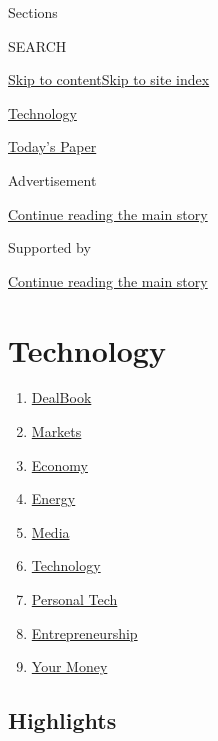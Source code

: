 Sections

SEARCH

\protect\hyperlink{site-content}{Skip to
content}\protect\hyperlink{site-index}{Skip to site index}

\href{https://www.nytimes.com/section/technology}{Technology}

\href{https://myaccount.nytimes.com/auth/login?response_type=cookie\&client_id=vi}{}

\href{https://www.nytimes.com/section/todayspaper}{Today's Paper}

Advertisement

\protect\hyperlink{after-top}{Continue reading the main story}

Supported by

\protect\hyperlink{after-sponsor}{Continue reading the main story}

\hypertarget{technology}{%
\section{Technology}\label{technology}}

\begin{enumerate}
\def\labelenumi{\arabic{enumi}.}
\tightlist
\item
  \href{/pages/business/dealbook/index.html}{DealBook}
\item
  \href{https://markets.on.nytimes.com}{Markets}
\item
  \href{/section/business/economy}{Economy}
\item
  \href{/section/business/energy-environment}{Energy}
\item
  \href{/section/business/media}{Media}
\item
  \href{/section/technology}{Technology}
\item
  \href{/section/technology/personaltech}{Personal Tech}
\item
  \href{/section/business/smallbusiness}{Entrepreneurship}
\item
  \href{/section/your-money}{Your Money}
\end{enumerate}

\hypertarget{highlights}{%
\subsection{Highlights}\label{highlights}}


